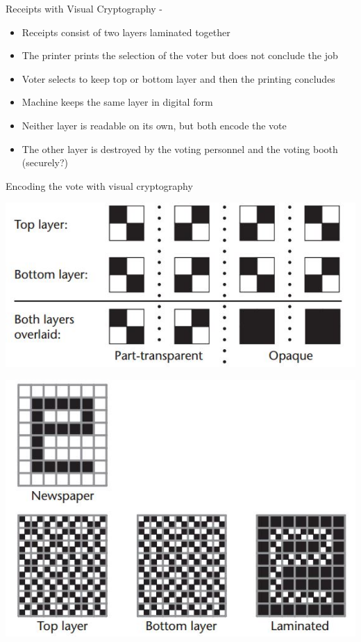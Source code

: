 \documentclass{beamer}
\begin{document}
\begin{frame}{Receipts with Visual Cryptography - \cite{chaum2004secret}}
\begin{itemize}
\item Receipts consist of two layers laminated together
\item The printer prints the selection of the voter but does not conclude the job
\item Voter selects to keep top or bottom layer and then the printing concludes
\item Machine keeps the same layer in digital form
\item Neither layer is readable on its own, but both encode the vote
\item The other layer is destroyed by the voting personnel and the voting booth (securely?)
\end{itemize}
\end{frame}

\begin{frame}[allowframebreaks]{Encoding the vote with visual cryptography}
\begin{center}
\includegraphics[scale=0.5]{visual}
\end{center}
\begin{center}
\includegraphics[scale=0.5]{visual1}
\end{center}
\end{frame}
\end{document}
